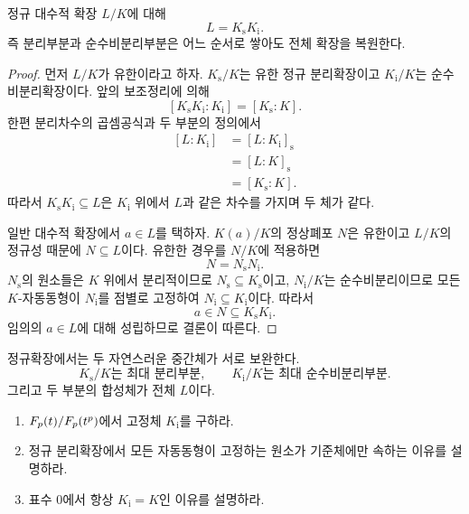 \begin{theorem}
정규 대수적 확장 $L/K$에 대해
\[
  L=K_{\mathrm s}K_{\mathrm i}.
\]
즉 분리부분과 순수비분리부분은 어느 순서로 쌓아도 전체 확장을 복원한다.
\end{theorem}

\begin{proof}
먼저 $L/K$가 유한이라고 하자. $K_{\mathrm s}/K$는 유한 정규 분리확장이고 $K_{\mathrm i}/K$는 순수비분리확장이다. 앞의 보조정리에 의해
\[
  [K_{\mathrm s}K_{\mathrm i}:K_{\mathrm i}]
  =[K_{\mathrm s}:K].
\]
한편 분리차수의 곱셈공식과 두 부분의 정의에서
\[
\begin{aligned}
  [L:K_{\mathrm i}]
  &=[L:K_{\mathrm i}]_{\mathrm s}\\
  &=[L:K]_{\mathrm s}\\
  &=[K_{\mathrm s}:K].
\end{aligned}
\]
따라서 $K_{\mathrm s}K_{\mathrm i}\subseteq L$은 $K_{\mathrm i}$ 위에서 $L$과 같은 차수를 가지며 두 체가 같다.

일반 대수적 확장에서 $a\in L$를 택하자. $K(a)/K$의 정상폐포 $N$은 유한이고 $L/K$의 정규성 때문에 $N\subseteq L$이다. 유한한 경우를 $N/K$에 적용하면
\[
  N=N_{\mathrm s}N_{\mathrm i}.
\]
$N_{\mathrm s}$의 원소들은 $K$ 위에서 분리적이므로 $N_{\mathrm s}\subseteq K_{\mathrm s}$이고, $N_{\mathrm i}/K$는 순수비분리이므로 모든 $K$-자동동형이 $N_{\mathrm i}$를 점별로 고정하여 $N_{\mathrm i}\subseteq K_{\mathrm i}$이다. 따라서
\[
  a\in N\subseteq K_{\mathrm s}K_{\mathrm i}.
\]
임의의 $a\in L$에 대해 성립하므로 결론이 따른다.
\end{proof}

\begin{keyidea}
정규확장에서는 두 자연스러운 중간체가 서로 보완한다.
\[
  K_{\mathrm s}/K\text{는 최대 분리부분},
  \qquad
  K_{\mathrm i}/K\text{는 최대 순수비분리부분}.
\]
그리고 두 부분의 합성체가 전체 $L$이다.
\end{keyidea}

\begin{checkpoint}
\begin{enumerate}[label=(\alph*)]
  \item $F_p(t)/F_p(t^p)$에서 고정체 $K_{\mathrm i}$를 구하라.
  \item 정규 분리확장에서 모든 자동동형이 고정하는 원소가 기준체에만 속하는 이유를 설명하라.
  \item 표수 $0$에서 항상 $K_{\mathrm i}=K$인 이유를 설명하라.
\end{enumerate}
\end{checkpoint}
